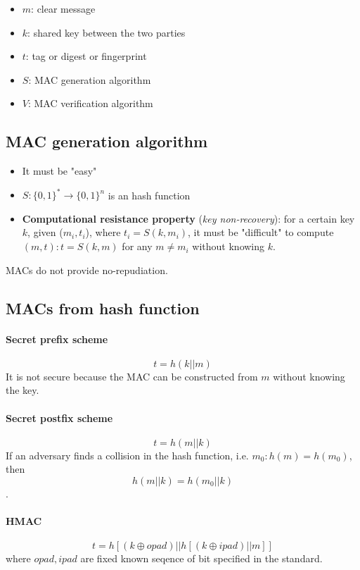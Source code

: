 \documentclass[a4paper,12pt]{article}
\begin{document}
\begin{itemize}
	\item $m$: clear message
	\item $k$: shared key between the two parties
	\item $t$: tag or digest or fingerprint
	\item $S$: MAC generation algorithm
	\item $V$: MAC verification algorithm
\end{itemize}

\subsection{MAC generation algorithm}
\begin{itemize}
	\item It must be "easy"
	\item $S : \{0,1\}^* \rightarrow \{0,1\}^n$ is an hash function
	\item \textbf{Computational resistance property} (\textit{key non-recovery}): for a certain key $k$, given ($m_i, t_i$), where $t_i = S(k, m_i)$, it must be "difficult" to compute $(m, t) : t = S(k, m)$ for any $m \neq m_i$ without knowing $k$.
\end{itemize}

MACs do not provide no-repudiation.

\subsection{MACs from hash function}
\paragraph{Secret prefix scheme} 
$$t = h(k||m)$$
It is not secure because the MAC can be constructed from $m$ without knowing the key.

\paragraph{Secret postfix scheme}
$$t = h(m||k)$$
If an adversary finds a collision in the hash function, i.e. $m_0 : h(m) = h(m_0)$, then $$h(m||k) = h(m_0||k)$$.

\paragraph{HMAC}
$$ t = h[(k \oplus opad) || h[(k \oplus ipad) || m]]$$
where $opad, ipad$ are fixed known seqence of bit specified in the standard.
\end{document}
